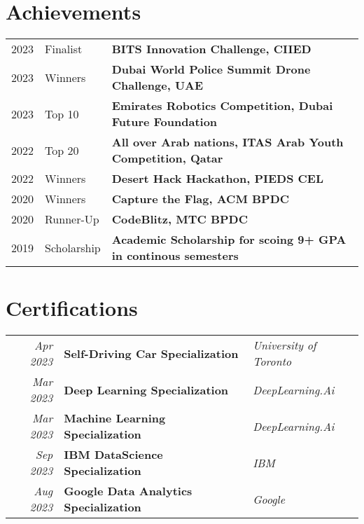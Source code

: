 \documentclass[letterpaper]{deedy-resume} %
\begin{document}
\begin{minipage}[t]{0.66\textwidth}
\vspace{-2.5mm}

\section{Achievements} 

\begin{tabular}{rll}
2023 & Finalist & \textbf{BITS Innovation Challenge, CIIED} \\
2023	 & Winners & \textbf{Dubai World Police Summit Drone Challenge, UAE}\\
2023	 & Top 10 & \textbf{Emirates Robotics Competition, Dubai Future Foundation}\\
2022	 & Top 20 & \textbf{All over Arab nations, ITAS Arab Youth Competition, Qatar}\\
2022	 & Winners & \textbf{Desert Hack Hackathon, PIEDS CEL}\\
2020 & Winners & \textbf{Capture the Flag, ACM BPDC} \\
2020 & Runner-Up & \textbf{CodeBlitz, MTC BPDC} \\
2019 & Scholarship & \textbf{Academic Scholarship for scoing 9+ GPA in continous semesters} \\
\end{tabular}

\sectionspace %


\vspace{-2.5mm}

\section{Certifications } 

\begin{tabular}{rll}
\textit{Apr 2023} & \textbf{Self-Driving Car Specialization} & \textit{University of Toronto} \\
\textit{Mar 2023} & \textbf{Deep Learning Specialization} & \textit{DeepLearning.Ai}\\
\textit{Mar 2023} & \textbf{Machine Learning Specialization} & \textit{DeepLearning.Ai}\\
\textit{Sep 2023} & \textbf{IBM DataScience Specialization} & \textit{IBM}\\
\textit{Aug 2023} & \textbf{Google Data Analytics Specialization} & \textit{Google}\\
\end{tabular}

\sectionspace %


\end{minipage} %
\end{document}
